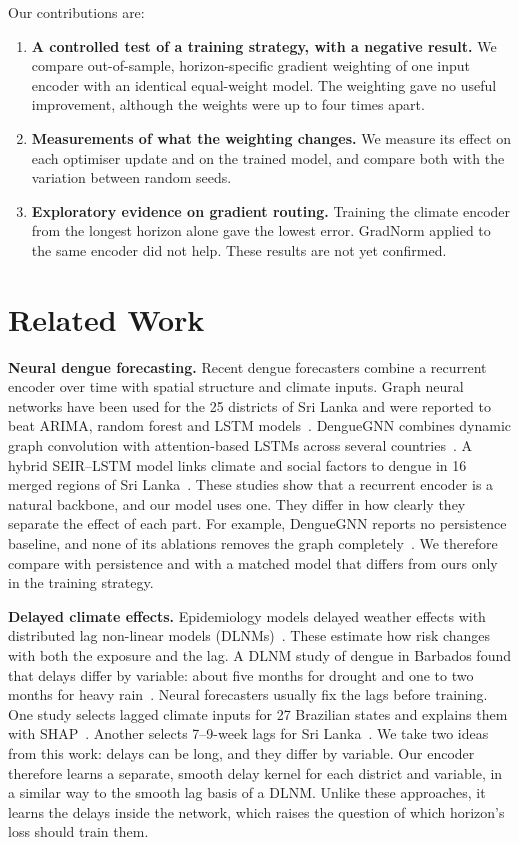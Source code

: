 \documentclass[conference]{IEEEtran}
\begin{document}
Our contributions are:
\begin{enumerate}
\item \textbf{A controlled test of a training strategy, with a negative result.} We compare out-of-sample, horizon-specific gradient weighting of one input encoder with an identical equal-weight model. The weighting gave no useful improvement, although the weights were up to four times apart.
\item \textbf{Measurements of what the weighting changes.} We measure its effect on each optimiser update and on the trained model, and compare both with the variation between random seeds.
\item \textbf{Exploratory evidence on gradient routing.} Training the climate encoder from the longest horizon alone gave the lowest error. GradNorm applied to the same encoder did not help. These results are not yet confirmed.
\end{enumerate}

\section{Related Work}

\textbf{Neural dengue forecasting.} Recent dengue forecasters combine a recurrent encoder over time with spatial structure and climate inputs. Graph neural networks have been used for the 25 districts of Sri Lanka and were reported to beat ARIMA, random forest and LSTM models~\cite{weng2024graph}. DengueGNN combines dynamic graph convolution with attention-based LSTMs across several countries~\cite{gulmohamed2026denguegnn}. A hybrid SEIR--LSTM model links climate and social factors to dengue in 16 merged regions of Sri Lanka~\cite{liu2025explainable}. These studies show that a recurrent encoder is a natural backbone, and our model uses one. They differ in how clearly they separate the effect of each part. For example, DengueGNN reports no persistence baseline, and none of its ablations removes the graph completely~\cite{gulmohamed2026denguegnn}. We therefore compare with persistence and with a matched model that differs from ours only in the training strategy.

\textbf{Delayed climate effects.} Epidemiology models delayed weather effects with distributed lag non-linear models (DLNMs)~\cite{gasparrini2010dlnm}. These estimate how risk changes with both the exposure and the lag. A DLNM study of dengue in Barbados found that delays differ by variable: about five months for drought and one to two months for heavy rain~\cite{lowe2018barbados}. Neural forecasters usually fix the lags before training. One study selects lagged climate inputs for 27 Brazilian states and explains them with SHAP~\cite{chen2025climatespatial}. Another selects 7--9-week lags for Sri Lanka~\cite{liu2025explainable}. We take two ideas from this work: delays can be long, and they differ by variable. Our encoder therefore learns a separate, smooth delay kernel for each district and variable, in a similar way to the smooth lag basis of a DLNM. Unlike these approaches, it learns the delays inside the network, which raises the question of which horizon's loss should train them.
\end{document}
